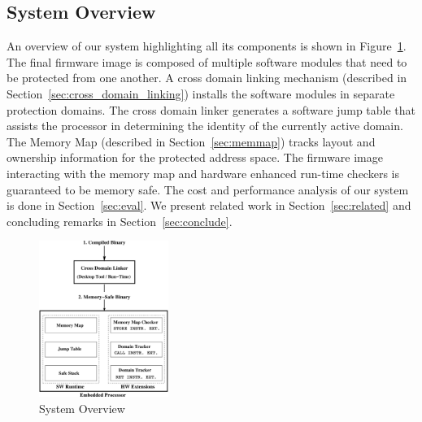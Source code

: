 \subsection{System Overview}
%
An overview of our system highlighting all its components is shown in Figure~\ref{fig:sys_overview}.
%
The final firmware image is composed of multiple software modules that need to be protected from one another.
%
%
A cross domain linking mechanism (described in Section~\ref{sec:cross_domain_linking}) installs the software modules in separate protection domains.
%
The cross domain linker generates a software jump table that assists the processor in determining the identity of the currently active domain.
%
The Memory Map (described in Section~\ref{sec:memmap}) tracks layout and ownership information for the protected address space.
%
The firmware image interacting with the memory map and hardware enhanced run-time checkers is guaranteed to be memory safe.
%
The cost and performance analysis of our system is done in Section~\ref{sec:eval}.
%
We present related work in Section~\ref{sec:related} and concluding remarks in Section~\ref{sec:conclude}.
%
\begin{figure}[htbp]
   \centering
   \includegraphics[height = 2.0in, keepaspectratio=true]{figures/sysoverview.pdf} 
   \caption{System Overview}
   \label{fig:sys_overview}
\end{figure}
%





